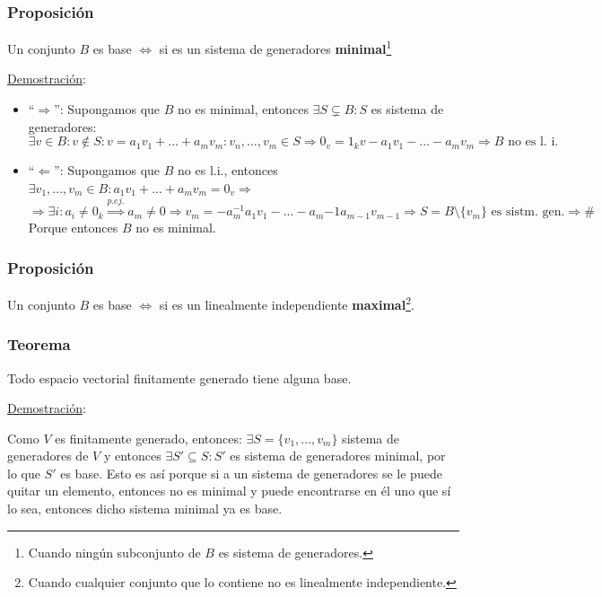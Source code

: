 \documentclass[10pt,a4paper,openright]{book}
\begin{document}
\subsubsection*{Proposición}
Un conjunto $B$ es base $\Leftrightarrow$ si es un sistema de generadores \textbf{minimal}\footnote{Cuando ningún subconjunto de $B$ es sistema de generadores.}\par
\underline{Demostración}:
\begin{itemize}
\item ``$\Rightarrow$'':
	Supongamos que $B$ no es minimal, entonces $\exists S\subsetneq B: S$ es sistema de generadores:
	$$\exists v\in B: v\notin S: v=a_1v_1+...+a_mv_m: v_n, ..., v_m\in S\Rightarrow 0_v=1_kv-a_1v_1-...-a_mv_m\Rightarrow B\mbox{ no es l. i.}$$
	
\item ``$\Leftarrow$'':
	Supongamos que $B$ no es l.i., entonces $\exists v_1, ..., v_m\in B: a_1v_1+...+ a_mv_m=0_v\Rightarrow$
	$$\Rightarrow \exists i: a_i\neq 0_k\stackrel{p.ej.}{\Rightarrow}a_m\neq 0\Rightarrow v_m=-a_m^{-1}a_1v_1-...-a_m{-1}a_{m-1}v_{m-1}\Rightarrow S=B\mbox{\textbackslash}\{v_m\} \mbox{ es sistm. gen.}\Rightarrow \#$$
Porque entonces $B$ no es minimal.
\end{itemize}

\subsubsection*{Proposición}
Un conjunto $B$ es base $\Leftrightarrow$ si es un linealmente independiente \textbf{maximal}\footnote{Cuando cualquier conjunto que lo contiene no es linealmente independiente.}.\par

\subsubsection*{Teorema}
Todo espacio vectorial finitamente generado tiene alguna base.\par
\underline{Demostración}:\par
Como $V$ es finitamente generado, entonces: $\exists S=\{v_1, ..., v_m\}$ sistema de generadores de $V$ y entonces $\exists S'\subseteq S: S'$ es sistema de generadores minimal, por lo que $S'$ es base. Esto es así porque si a un sistema de generadores se le puede quitar un elemento, entonces no es minimal y puede encontrarse en él uno que sí lo sea, entonces dicho sistema minimal ya es base.\par
\end{document}
